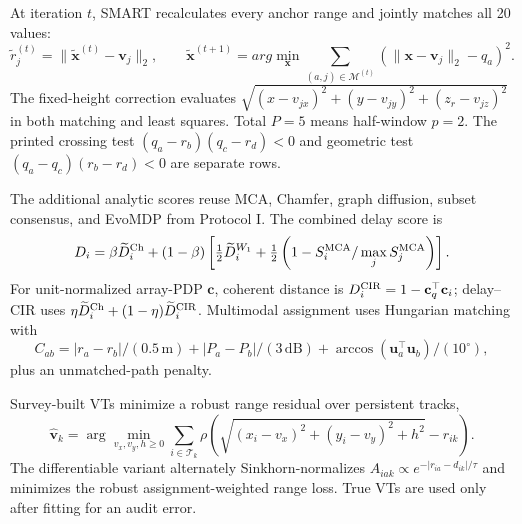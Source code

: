 \documentclass[10pt]{article}
\newcommand{\m}{\,\mathrm m}
\newcommand{\degc}{^{\circ}}
\begin{document}
At iteration $t$, SMART recalculates every anchor range and jointly matches all
20 values:
\begin{equation}
 \widetilde r_j^{(t)}=\|\widetilde{\mathbf x}^{(t)}-\mathbf v_j\|_2,
 \qquad
 \widetilde{\mathbf x}^{(t+1)}=arg\min_{\mathbf x}
 \sum_{(a,j)\in\mathcal M^{(t)}}
 \left(\|\mathbf x-\mathbf v_j\|_2-q_a\right)^2.
\end{equation}
The fixed-height correction evaluates
$\sqrt{(x-v_{jx})^2+(y-v_{jy})^2+(z_r-v_{jz})^2}$ in both matching and least
squares.  Total $P=5$ means half-window $p=2$.  The printed crossing test
$(q_a-r_b)(q_c-r_d)<0$ and geometric test
$(q_a-q_c)(r_b-r_d)<0$ are separate rows.

The additional analytic scores reuse MCA, Chamfer, graph diffusion, subset
consensus, and EvoMDP from Protocol I.  The combined delay score is
\begin{equation}
 D_i=\beta\widetilde D_i^{\rm Ch}+(1-\beta)
 \left[\tfrac12\widetilde D_i^{W_1}+
 \tfrac12\left(1-S_i^{\rm MCA}/\max_jS_j^{\rm MCA}\right)\right].
\end{equation}
For unit-normalized array-PDP $\mathbf c$, coherent distance is
$D_i^{\rm CIR}=1-\mathbf c_q^\top\mathbf c_i$; delay--CIR uses
$\eta\widetilde D_i^{\rm Ch}+(1-\eta)\widetilde D_i^{\rm CIR}$.
Multimodal assignment uses Hungarian matching with
\begin{equation}
 C_{ab}=|r_a-r_b|/(0.5\m)+|P_a-P_b|/(3\,\mathrm{dB})+
 \arccos(\mathbf u_a^\top\mathbf u_b)/(10\degc),
\end{equation}
plus an unmatched-path penalty.

Survey-built VTs minimize a robust range residual over persistent tracks,
\begin{equation}
 \widehat{\mathbf v}_k=\arg\min_{v_x,v_y,h\ge0}
 \sum_{i\in\mathcal T_k}\rho\!\left(
 \sqrt{(x_i-v_x)^2+(y_i-v_y)^2+h^2}-r_{ik}\right).
\end{equation}
The differentiable variant alternately Sinkhorn-normalizes
$A_{iak}\propto e^{-|r_{ia}-d_{ik}|/\tau}$ and minimizes the robust
assignment-weighted range loss.  True VTs are used only after fitting for an
audit error.
\end{document}
